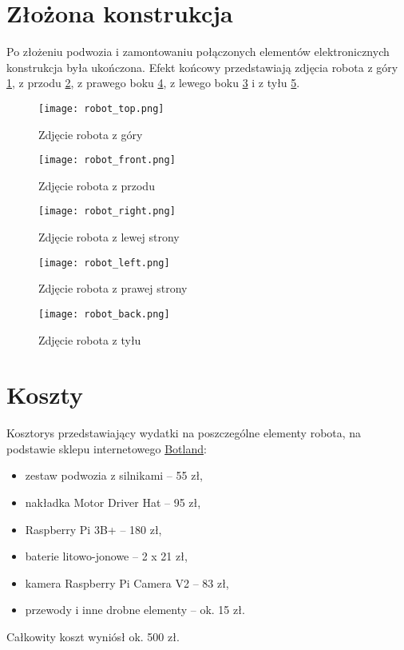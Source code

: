 \section{Złożona konstrukcja}
Po złożeniu podwozia i zamontowaniu połączonych elementów elektronicznych konstrukcja była ukończona.
Efekt końcowy przedstawiają zdjęcia robota z góry \ref{rys:robot_top}, z przodu \ref{rys:robot_front}, z prawego boku \ref{rys:robot_right}, z lewego boku \ref{rys:robot_left} i z tyłu \ref{rys:robot_back}.
\begin{figure}[!hb]
    \centering \texttt{[image: robot\_top.png]}
    \caption{Zdjęcie robota z góry}
    \label{rys:robot_top}
\end{figure}
\begin{figure}[!hb]
    \centering \texttt{[image: robot\_front.png]}
    \caption{Zdjęcie robota z przodu}
    \label{rys:robot_front}
\end{figure}
\begin{figure}[!hb]
    \centering \texttt{[image: robot\_right.png]}
    \caption{Zdjęcie robota z lewej strony}
    \label{rys:robot_left}
\end{figure}
\begin{figure}[!hb]
    \centering \texttt{[image: robot\_left.png]}
    \caption{Zdjęcie robota z prawej strony}
    \label{rys:robot_right}
\end{figure}
\begin{figure}[!hb]
    \centering \texttt{[image: robot\_back.png]}
    \caption{Zdjęcie robota z tyłu}
    \label{rys:robot_back}
\end{figure}

\section{Koszty}
Kosztorys przedstawiający wydatki na poszczególne elementy robota, na podstawie sklepu internetowego \href{https://botland.com.pl/}{Botland}:
\begin{itemize}
    \item zestaw podwozia z silnikami -- 55 zł,
    \item nakładka Motor Driver Hat -- 95 zł,
    \item Raspberry Pi 3B+ -- 180 zł,
    \item baterie litowo-jonowe -- 2 x 21 zł,
    \item kamera Raspberry Pi Camera V2 -- 83 zł,
    \item przewody i inne drobne elementy -- ok. 15 zł.
\end{itemize}
Całkowity koszt wyniósł ok. 500 zł.
